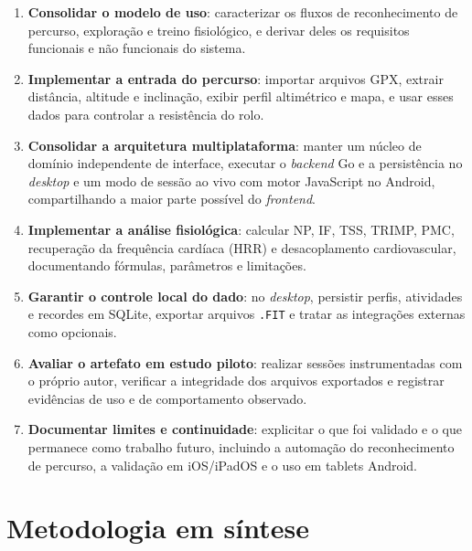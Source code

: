 \begin{enumerate}
    \item \textbf{Consolidar o modelo de uso}: caracterizar os fluxos de
        reconhecimento de percurso, exploração e treino fisiológico, e derivar
        deles os requisitos funcionais e não funcionais do sistema.

    \item \textbf{Implementar a entrada do percurso}: importar arquivos GPX,
        extrair distância, altitude e inclinação, exibir perfil altimétrico e
        mapa, e usar esses dados para controlar a resistência do rolo.

    \item \textbf{Consolidar a arquitetura multiplataforma}: manter um núcleo de
        domínio independente de interface, executar o \textit{backend} Go e a
        persistência no \textit{desktop} e um modo de sessão ao vivo com motor
        JavaScript no Android, compartilhando a maior parte possível do
        \textit{frontend}.

    \item \textbf{Implementar a análise fisiológica}: calcular NP, IF, TSS,
        TRIMP, PMC, recuperação da frequência cardíaca (HRR) e desacoplamento
        cardiovascular, documentando fórmulas, parâmetros e limitações.

    \item \textbf{Garantir o controle local do dado}: no \textit{desktop},
        persistir perfis, atividades e recordes em SQLite, exportar arquivos
        \texttt{.FIT} e tratar as integrações externas como opcionais.

    \item \textbf{Avaliar o artefato em estudo piloto}: realizar sessões
        instrumentadas com o próprio autor, verificar a integridade dos arquivos
        exportados e registrar evidências de uso e de comportamento observado.

    \item \textbf{Documentar limites e continuidade}: explicitar o que foi
        validado e o que permanece como trabalho futuro, incluindo a automação
        do reconhecimento de percurso, a validação em iOS/iPadOS e o uso em
        tablets Android.
\end{enumerate}

\section{Metodologia em síntese}
\label{sec:metodologia}


